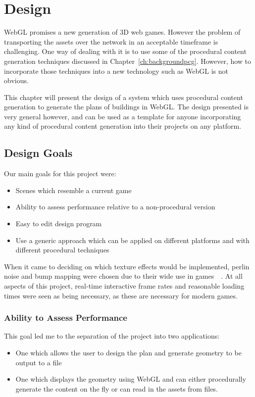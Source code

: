 \chapter{Design}
\label{ch:design}
WebGL promises a new generation of 3D web games.
However the problem of transporting the assets over the network in an acceptable timeframe is challenging.
One way of dealing with it is to use some of the procedural content generation techniques discussed in Chapter~\ref{ch:backgroundpcg}.
However, how to incorporate those techniques into a new technology such as WebGL is not obvious.

This chapter will present the design of a system which uses procedural content generation to generate the plans of buildings in WebGL.
The design presented is very general however, and can be used as a template for anyone incorporating any kind of procedural content generation into their projects on any platform.

\section{Design Goals}
\label{sec:designgoals}
Our main goals for this project were:
\begin{itemize}
    \item Scenes which resemble a current game
    \item Ability to assess performance relative to a non-procedural version
    \item Easy to edit design program
	\item Use a generic approach which can be applied on different platforms and with different procedural techniques
\end{itemize}

When it came to deciding on which texture effects would be implemented, perlin noise and bump mapping were chosen due to their wide use in games~\cite{web:perlingames}~\cite{kilgard2000practical}.
At all aspects of this project, real-time interactive frame rates and reasonable loading times were seen as being necessary, as these are necessary for modern games.

\subsection{Ability to Assess Performance}
This goal led me to the separation of the project into two applications:
\begin{itemize}
	\item One which allows the user to design the plan and generate geometry to be output to a file
	\item One which displays the geometry using WebGL and can either procedurally generate the content on the fly or can read in the assets from files.
\end{itemize}

